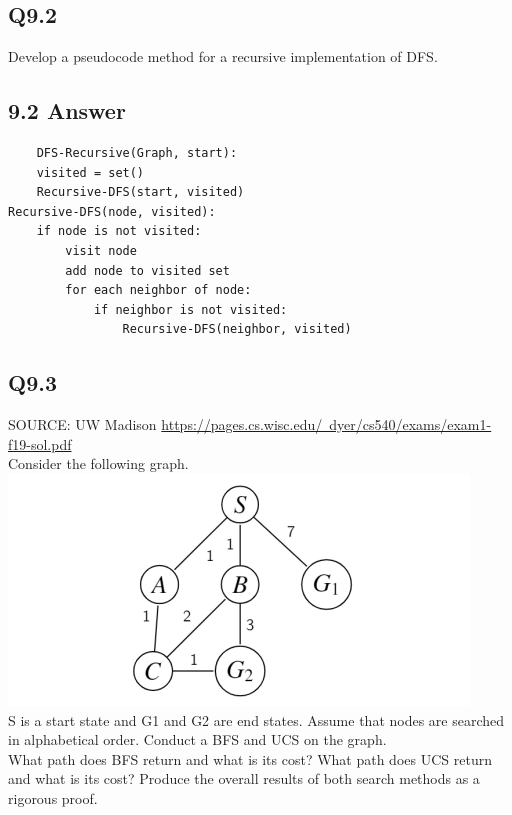 \documentclass{article}
\begin{document}
\subsection*{Q9.2}
Develop a pseudocode method for a recursive implementation of DFS.
\newpage
\subsection*{9.2 Answer}
\begin{verbatim}
    DFS-Recursive(Graph, start):
    visited = set()
    Recursive-DFS(start, visited)
Recursive-DFS(node, visited):
    if node is not visited:
        visit node
        add node to visited set
        for each neighbor of node:
            if neighbor is not visited:
                Recursive-DFS(neighbor, visited)
\end{verbatim}
\newpage

\subsection*{Q9.3}
SOURCE: UW Madison \href{https://pages.cs.wisc.edu/~dyer/cs540/exams/exam1-f19-sol.pdf}{https://pages.cs.wisc.edu/~dyer/cs540/exams/exam1-f19-sol.pdf}
\\ Consider the following graph.
\\ \includegraphics{UCS_question_graph.png}
\\ S is a start state and G1 and G2 are end states. Assume that nodes are searched in alphabetical order. Conduct a BFS and UCS on the graph.
\\ What path does BFS return and what is its cost? What path does UCS return and what is its cost? Produce the overall
results of both search methods as a rigorous proof.
\newpage
\end{document}

